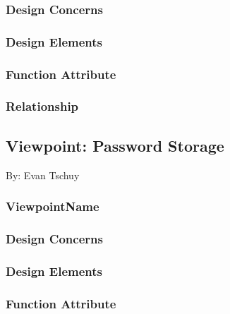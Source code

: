 \documentclass[letterpaper, 10pt, draftclsnofoot, compsoc, onecolumn]{IEEEtran}
\begin{document}
{\noindent  \par}

\subsubsection{Design Concerns}
{\noindent  \par}

\subsubsection{Design Elements}
{\noindent  \par}

\subsubsection{Function Attribute}
{\noindent  \par}

\subsubsection{Relationship}


\subsection{Viewpoint: Password Storage}
{\noindent By: Evan Tschuy \par}

\subsubsection{ViewpointName}
{\noindent  \par}

\subsubsection{Design Concerns}
{\noindent  \par}

\subsubsection{Design Elements}
{\noindent  \par}

\subsubsection{Function Attribute}
{\noindent  \par}
\end{document}
